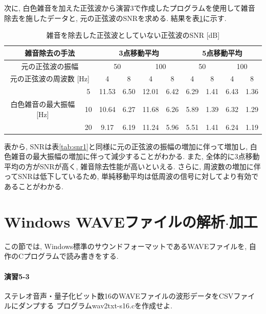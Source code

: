 \documentclass[titlepage]{jsarticle}
\begin{document}
        次に, 白色雑音を加えた正弦波から演習3で作成したプログラムを使用して雑音除去を施したデータと,
        元の正弦波のSNRを求める. 結果を表\ref{tab:snr2}に示す.

        \begin{table}[h]
            \centering
            \caption{雑音を除去した正弦波としていない正弦波のSNR [dB]}
            \label{tab:snr2}
            \begin{tabular}{c|c||cc|cc|cc|cc} \hline
                \multicolumn{2}{c||}{雑音除去の手法} & \multicolumn{4}{c|}{3点移動平均} & \multicolumn{4}{c}{5点移動平均} \\ \hline
                \multicolumn{2}{c||}{元の正弦波の振幅} & \multicolumn{2}{c|}{50} & \multicolumn{2}{c|}{100} & \multicolumn{2}{c|}{50} & \multicolumn{2}{c}{100} \\ \hline
                \multicolumn{2}{c||}{元の正弦波の周波数 [Hz]} & 4 & 8 & 4 & 8 & 4 & 8 & 4 & 8 \\ \hline \hline
                & 5 & 11.53 & 6.50 & 12.01 & 6.42 & 6.29 & 1.41 & 6.43 & 1.36 \\
                白色雑音の最大振幅 [Hz] & 10 & 10.64 & 6.27 & 11.68 & 6.26 & 5.89 & 1.39 & 6.32 & 1.29 \\
                & 20 & 9.17 & 6.19 & 11.24 & 5.96 & 5.51 & 1.41 & 6.24 & 1.19 \\ \hline
            \end{tabular}
        \end{table}
        
        表から, SNRは表\ref{tab:snr1}と同様に元の正弦波の振幅の増加に伴って増加し,
        白色雑音の最大振幅の増加に伴って減少することがわかる.
        また, 全体的に3点移動平均の方がSNRが高く, 雑音除去性能が高いといえる.
        さらに, 周波数の増加に伴ってSNRは低下しているため,
        単純移動平均は低周波の信号に対してより有効であることがわかる.

\section{Windows WAVEファイルの解析$\cdot$加工}
    この節では, Windows標準のサウンドフォーマットであるWAVEファイルを,
    自作のCプログラムで読み書きをする.

    \paragraph{演習5-3} ステレオ音声・量子化ビット数16のWAVEファイルの波形データをCSVファイルにダンプする
    プログラムwav2txt-s16.cを作成せよ.
\end{document}

